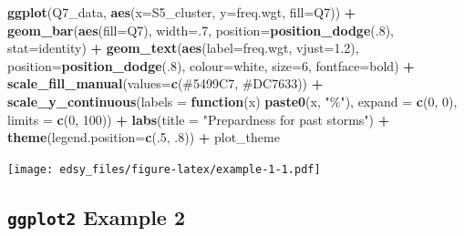 \documentclass[
]{book}
\newenvironment{Shaded}{\begin{snugshade}}{\end{snugshade}}
\newcommand{\ControlFlowTok}[1]{\textcolor[rgb]{0.13,0.29,0.53}{\textbf{#1}}}
\newcommand{\DataTypeTok}[1]{\textcolor[rgb]{0.13,0.29,0.53}{#1}}
\newcommand{\DecValTok}[1]{\textcolor[rgb]{0.00,0.00,0.81}{#1}}
\newcommand{\FloatTok}[1]{\textcolor[rgb]{0.00,0.00,0.81}{#1}}
\newcommand{\KeywordTok}[1]{\textcolor[rgb]{0.13,0.29,0.53}{\textbf{#1}}}
\newcommand{\NormalTok}[1]{#1}
\newcommand{\OperatorTok}[1]{\textcolor[rgb]{0.81,0.36,0.00}{\textbf{#1}}}
\newcommand{\StringTok}[1]{\textcolor[rgb]{0.31,0.60,0.02}{#1}}
\begin{document}
\begin{Shaded}
\begin{Highlighting}[]
\KeywordTok{ggplot}\NormalTok{(Q7\_data, }\KeywordTok{aes}\NormalTok{(}\DataTypeTok{x=}\NormalTok{S5\_cluster, }\DataTypeTok{y=}\NormalTok{freq.wgt, }\DataTypeTok{fill=}\NormalTok{Q7)) }\OperatorTok{+}
\StringTok{  }\KeywordTok{geom\_bar}\NormalTok{(}\KeywordTok{aes}\NormalTok{(}\DataTypeTok{fill=}\NormalTok{Q7), }\DataTypeTok{width=}\NormalTok{.}\DecValTok{7}\NormalTok{, }\DataTypeTok{position=}\KeywordTok{position\_dodge}\NormalTok{(.}\DecValTok{8}\NormalTok{), }\DataTypeTok{stat=}\StringTok{\textquotesingle{}identity\textquotesingle{}}\NormalTok{) }\OperatorTok{+}
\StringTok{  }\KeywordTok{geom\_text}\NormalTok{(}\KeywordTok{aes}\NormalTok{(}\DataTypeTok{label=}\NormalTok{freq.wgt, }\DataTypeTok{vjust=}\FloatTok{1.2}\NormalTok{), }\DataTypeTok{position=}\KeywordTok{position\_dodge}\NormalTok{(.}\DecValTok{8}\NormalTok{), }\DataTypeTok{colour=}\StringTok{\textquotesingle{}white\textquotesingle{}}\NormalTok{, }\DataTypeTok{size=}\DecValTok{6}\NormalTok{, }\DataTypeTok{fontface=}\StringTok{\textquotesingle{}bold\textquotesingle{}}\NormalTok{) }\OperatorTok{+}
\StringTok{  }\KeywordTok{scale\_fill\_manual}\NormalTok{(}\DataTypeTok{values=}\KeywordTok{c}\NormalTok{(}\StringTok{\textquotesingle{}\#5499C7\textquotesingle{}}\NormalTok{, }\StringTok{\textquotesingle{}\#DC7633\textquotesingle{}}\NormalTok{)) }\OperatorTok{+}
\StringTok{  }\KeywordTok{scale\_y\_continuous}\NormalTok{(}\DataTypeTok{labels =} \ControlFlowTok{function}\NormalTok{(x) }\KeywordTok{paste0}\NormalTok{(x, }\StringTok{"\%"}\NormalTok{), }\DataTypeTok{expand =} \KeywordTok{c}\NormalTok{(}\DecValTok{0}\NormalTok{, }\DecValTok{0}\NormalTok{), }\DataTypeTok{limits =} \KeywordTok{c}\NormalTok{(}\DecValTok{0}\NormalTok{, }\DecValTok{100}\NormalTok{)) }\OperatorTok{+}
\StringTok{  }\KeywordTok{labs}\NormalTok{(}\DataTypeTok{title =} \StringTok{"Prepardness for past storms"}\NormalTok{) }\OperatorTok{+}
\StringTok{  }\KeywordTok{theme}\NormalTok{(}\DataTypeTok{legend.position=}\KeywordTok{c}\NormalTok{(.}\DecValTok{5}\NormalTok{, }\FloatTok{.8}\NormalTok{)) }\OperatorTok{+}
\StringTok{  }\NormalTok{plot\_theme}
\end{Highlighting}
\end{Shaded}

\texttt{[image: edsy\_files/figure-latex/example-1-1.pdf]}

\hypertarget{ggplot2-example-2}{%
\subsection{\texorpdfstring{\texttt{ggplot2} Example 2}{ggplot2 Example 2}}\label{ggplot2-example-2}}
\end{document}
